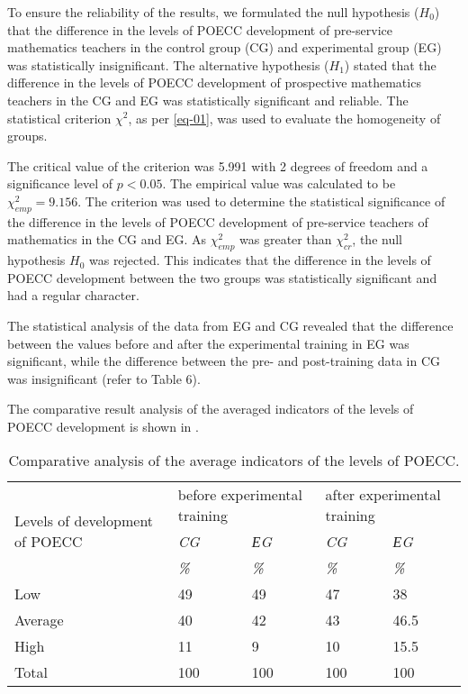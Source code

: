 To ensure the reliability of the results, we formulated the null
hypothesis ($H_0$) that the difference in the
levels of POECC development of pre-service mathematics teachers in the
control group (CG) and experimental group (EG) was statistically
insignificant. The alternative hypothesis
($H_1$) stated that the difference in the
levels of POECC development of prospective mathematics teachers in the
CG and EG was statistically significant and reliable. The statistical
criterion $\chi^2$, as per \cref{eq-01}, was used to evaluate the homogeneity of
groups.



The critical value of the criterion was 5.991 with 2 degrees of freedom
and a significance level of $p < 0.05$. The empirical
value was calculated to be $\chi^2_{emp} = 9.156$. The criterion was used to determine
the statistical significance of the difference in the levels of POECC
development of pre-service teachers of mathematics in the CG and EG. As $\chi^2_{emp}$
was greater than $\chi^2_{cr}$, the null hypothesis $H_0$ was
rejected. This indicates that the difference in the levels of POECC
development between the two groups was statistically significant and had
a regular character.



The statistical analysis of the data from EG and CG revealed that the
difference between the values before and after the experimental training
in EG was significant, while the difference between the pre- and
post-training data in CG was insignificant (refer to Table 6).
	
The comparative result analysis of the averaged indicators of the levels of POECC development is shown in .
	
\begin{table}[!htpb]
\centering
\begin{threeparttable}
\caption{Comparative analysis of the average indicators of the levels of POECC.}
\label{tab-05}
\begin{tabular}{l l l l l}
\toprule
\multicolumn{1}{p{3cm}}{\multirow{3}{=}{Levels of development of POECC}} & \multicolumn{2}{p{3cm}}{before experimental training} & \multicolumn{2}{p{3cm}}{after experimental training} \\
& \emph{CG} & \emph{ЕG} & \emph{CG} & \emph{ЕG}  \\
& \emph{\%} & \emph{\%} & \emph{\%} & \emph{\%}  \\
\midrule
Low & 49 & 49 & 47 & 38 \\
Average & 40 & 42 & 43 & 46.5 \\
High & 11 & 9 & 10 & 15.5 \\
Total & 100 & 100 & 100 & 100 \\
\bottomrule
\end{tabular}
\end{threeparttable}
\end{table}
	
